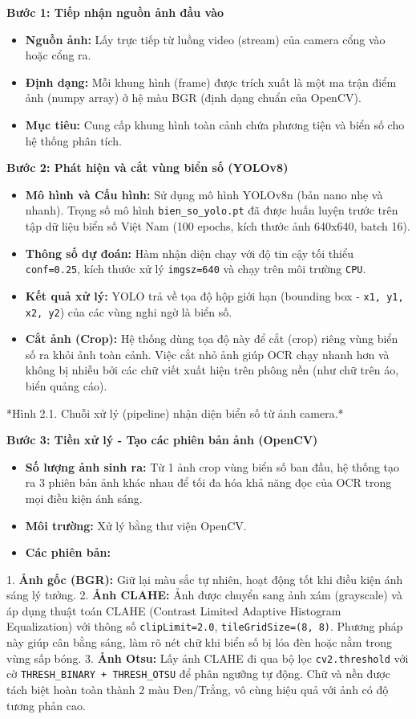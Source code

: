 \documentclass[a4paper,14pt]{extreport}
\begin{document}
\textbf{Bước 1: Tiếp nhận nguồn ảnh đầu vào}
\begin{itemize}[leftmargin=2em]
  \item \textbf{Nguồn ảnh:} Lấy trực tiếp từ luồng video (stream) của camera cổng vào hoặc cổng ra.
  \item \textbf{Định dạng:} Mỗi khung hình (frame) được trích xuất là một ma trận điểm ảnh (numpy array) ở hệ màu BGR (định dạng chuẩn của OpenCV).
  \item \textbf{Mục tiêu:} Cung cấp khung hình toàn cảnh chứa phương tiện và biển số cho hệ thống phân tích.
\end{itemize}
\textbf{Bước 2: Phát hiện và cắt vùng biển số (YOLOv8)}
\begin{itemize}[leftmargin=2em]
  \item \textbf{Mô hình và Cấu hình:} Sử dụng mô hình YOLOv8n (bản nano nhẹ và nhanh). Trọng số mô hình \texttt{bien\_so\_yolo.pt} đã được huấn luyện trước trên tập dữ liệu biển số Việt Nam (100 epochs, kích thước ảnh 640x640, batch 16).
  \item \textbf{Thông số dự đoán:} Hàm nhận diện chạy với độ tin cậy tối thiểu \texttt{conf=0.25}, kích thước xử lý \texttt{imgsz=640} và chạy trên môi trường \texttt{CPU}.
  \item \textbf{Kết quả xử lý:} YOLO trả về tọa độ hộp giới hạn (bounding box - \texttt{x1, y1, x2, y2}) của các vùng nghi ngờ là biển số.
  \item \textbf{Cắt ảnh (Crop):} Hệ thống dùng tọa độ này để cắt (crop) riêng vùng biển số ra khỏi ảnh toàn cảnh. Việc cắt nhỏ ảnh giúp OCR chạy nhanh hơn và không bị nhiễu bởi các chữ viết xuất hiện trên phông nền (như chữ trên áo, biển quảng cáo).
\end{itemize}
*Hình 2.1. Chuỗi xử lý (pipeline) nhận diện biển số từ ảnh camera.*

\textbf{Bước 3: Tiền xử lý - Tạo các phiên bản ảnh (OpenCV)}
\begin{itemize}[leftmargin=2em]
  \item \textbf{Số lượng ảnh sinh ra:} Từ 1 ảnh crop vùng biển số ban đầu, hệ thống tạo ra 3 phiên bản ảnh khác nhau để tối đa hóa khả năng đọc của OCR trong mọi điều kiện ánh sáng.
  \item \textbf{Môi trường:} Xử lý bằng thư viện OpenCV.
  \item \textbf{Các phiên bản:}
\end{itemize}
  1. \textbf{Ảnh gốc (BGR):} Giữ lại màu sắc tự nhiên, hoạt động tốt khi điều kiện ánh sáng lý tưởng.
  2. \textbf{Ảnh CLAHE:} Ảnh được chuyển sang ảnh xám (grayscale) và áp dụng thuật toán CLAHE (Contrast Limited Adaptive Histogram Equalization) với thông số \texttt{clipLimit=2.0}, \texttt{tileGridSize=(8, 8)}. Phương pháp này giúp cân bằng sáng, làm rõ nét chữ khi biển số bị lóa đèn hoặc nằm trong vùng sấp bóng.
  3. \textbf{Ảnh Otsu:} Lấy ảnh CLAHE đi qua bộ lọc \texttt{cv2.threshold} với cờ \texttt{THRESH\_BINARY + THRESH\_OTSU} để phân ngưỡng tự động. Chữ và nền được tách biệt hoàn toàn thành 2 màu Đen/Trắng, vô cùng hiệu quả với ảnh có độ tương phản cao.
\end{document}
